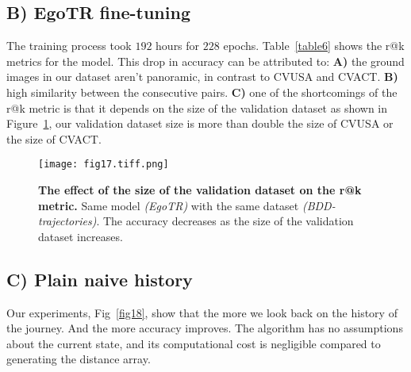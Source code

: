 \documentclass[10pt,letterpaper]{article}
\begin{document}
\FloatBarrier

\subsection*{B) EgoTR fine-tuning}

The training process took $192$ hours for $228$ epochs. Table~\ref{table6} shows the r@k metrics for the model. This drop in accuracy can be attributed to: {\bf A)} the ground images in our dataset aren't panoramic, in contrast to CVUSA and CVACT. {\bf B)} high similarity between the consecutive pairs. {\bf C)} one of the shortcomings of the r@k metric is that it depends on the size of the validation dataset as shown in  Figure~\ref{fig17}, our validation dataset size is more than double the size of CVUSA or the size of CVACT.

\begin{table}[!ht]
  \centering
  \caption{
  {\bf r@k metrics of EgoTR fine-tuned over the reshaped BDD-trajectories dataset.}}
  \label{table6}
\end{table}

\begin{figure}[!ht]
  \caption{{\bf The effect of the size of the validation dataset on the r@k metric.}  Same model \emph{(EgoTR)} with the same dataset \emph{(BDD-trajectories)}. The accuracy decreases as the size of the validation dataset increases.}
  \texttt{[image: fig17.tiff.png]}
  \label{fig17}
\end{figure}

\FloatBarrier

\subsection*{C) Plain naive history}
Our experiments, Fig~\ref{fig18}, show that the more we look back on the history of the journey. And the more accuracy improves. The algorithm has no assumptions about the current state, and its computational cost is negligible compared to generating the distance array.
\end{document}
